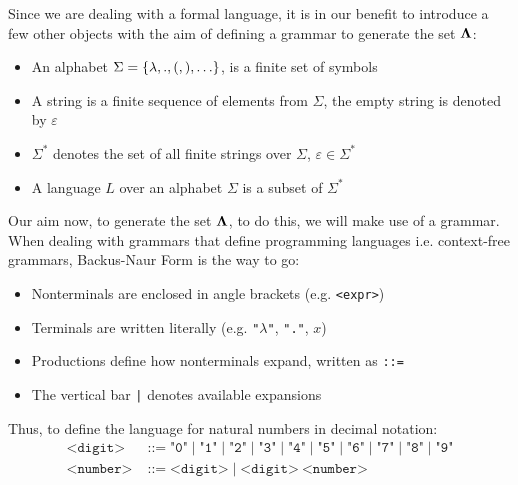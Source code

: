 \documentclass[12pt]{book}
\begin{document}
Since we are dealing with a formal language, it is in our benefit to introduce a few other objects with the aim of defining a grammar to generate the set $\mathbf{\Lambda}$:
\begin{itemize}
\item An alphabet \( \Sigma = \{ \lambda, ., (, ), \ldots \} \), is a finite set of symbols
\item A string is a finite sequence of elements from \( \Sigma \), the empty string is denoted by \( \varepsilon \)
\item \( \Sigma^* \) denotes the set of all finite strings over \( \Sigma \), \( \varepsilon \in \Sigma^* \)
\item A language \( L \) over an alphabet \( \Sigma \) is a subset of \( \Sigma^* \)
\end{itemize}
Our aim now, to generate the set $\mathbf{\Lambda}$,  to do this, we will make use of a grammar. When dealing with grammars that define programming languages i.e. context-free grammars, Backus-Naur Form is the way to go:
\begin{itemize}
\item Nonterminals are enclosed in angle brackets (e.g. \texttt{<expr>})
\item Terminals are written literally (e.g. \texttt{"$\lambda$"}, \texttt{"."}, $x$)
\item Productions define how nonterminals expand, written as \texttt{::=}
\item The vertical bar \texttt{|} denotes available expansions
\end{itemize}
Thus, to define the language for natural numbers in decimal notation:
\begin{align*}
  \texttt{<digit>} &\;\texttt{::=}\; \texttt{"0"} \;|\; \texttt{"1"} \;|\; \texttt{"2"} \;|\; \texttt{"3"} \;|\; \texttt{"4"} \;|\; \texttt{"5"} \;|\; \texttt{"6"} \;|\; \texttt{"7"} \;|\; \texttt{"8"} \;|\; \texttt{"9"} \\
  \texttt{<number>} &\;\texttt{::=}\; \texttt{<digit>} \;|\; \texttt{<digit>} \ \texttt{<number>}
\end{align*}
\end{document}
